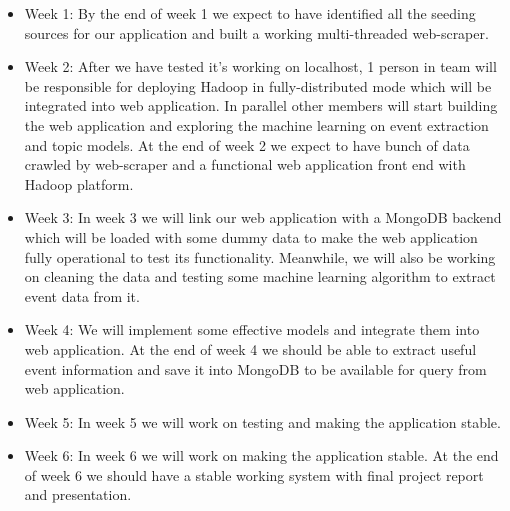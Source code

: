 \begin{itemize}
\item Week 1: By the end of week 1 we expect to have identified all the seeding
  sources for our application and built a working multi-threaded web-scraper.
\item Week 2: After we have tested it's working on localhost, 1 person in team
  will be responsible for deploying Hadoop in fully-distributed mode which will
  be integrated into web application. In parallel other members will start
  building the web application and exploring the machine learning on event
  extraction and topic models. At the end of week 2 we expect to have bunch of
  data crawled by web-scraper and a functional web application front end with
  Hadoop platform.
\item Week 3: In week 3 we will link our web application with a MongoDB backend
  which will be loaded with some dummy data to make the web application fully
  operational to test its functionality. Meanwhile, we will also be working on
  cleaning the data and testing some machine learning algorithm to extract event
  data from it.
\item Week 4: We will implement some effective models and integrate them into
  web application. At the end of week 4 we should be able to extract useful
  event information and save it into MongoDB to be available for query from web
  application.
\item Week 5: In week 5 we will work on testing and making the application
  stable.
\item Week 6: In week 6 we will work on making the application stable. At the
  end of week 6 we should have a stable working system with final project
  report and presentation.
\end{itemize}
